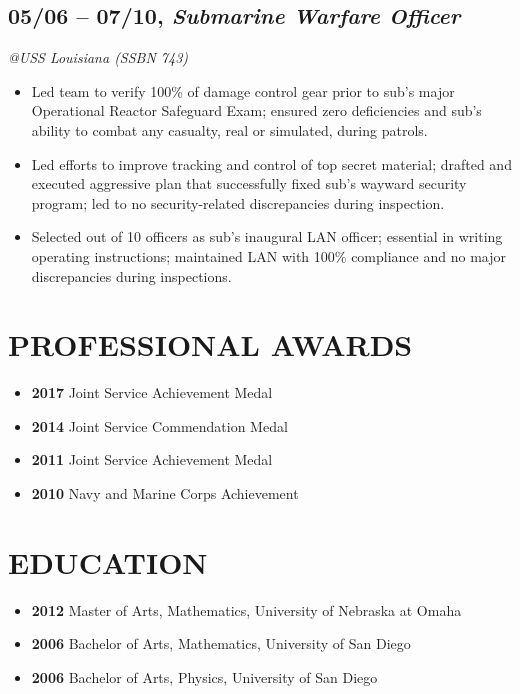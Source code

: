 \documentclass[10pt]{article}
\begin{document}
\subsection{05/06 -- 07/10, \textbf{\emph{Submarine Warfare
Officer}}}\label{submarine-warfare-officer}

\emph{@USS Louisiana (SSBN 743)}

\begin{itemize}
\itemsep1pt\parskip0pt
\item
  Led team to verify 100\% of damage control gear prior to sub's major
  Operational Reactor Safeguard Exam; ensured zero deficiencies and
  sub's ability to combat any casualty, real or simulated, during
  patrols.
\item
  Led efforts to improve tracking and control of top secret material;
  drafted and executed aggressive plan that successfully fixed sub's
  wayward security program; led to no security-related discrepancies
  during inspection.
\item
  Selected out of 10 officers as sub's inaugural LAN officer; essential
  in writing operating instructions; maintained LAN with 100\%
  compliance and no major discrepancies during inspections.
\end{itemize}

\section{PROFESSIONAL AWARDS}\label{professional-awards}

\begin{itemize}
\itemsep1pt\parskip0pt
\item
  \textbf{2017} Joint Service Achievement Medal
\item
  \textbf{2014} Joint Service Commendation Medal
\item
  \textbf{2011} Joint Service Achievement Medal
\item
  \textbf{2010} Navy and Marine Corps Achievement
\end{itemize}

\section{EDUCATION}\label{education}

\begin{itemize}
\itemsep1pt\parskip0pt
\item
  \textbf{2012} Master of Arts, Mathematics, University of Nebraska at
  Omaha
\item
  \textbf{2006} Bachelor of Arts, Mathematics, University of San Diego
\item
  \textbf{2006} Bachelor of Arts, Physics, University of San Diego
\end{itemize}
\end{document}
